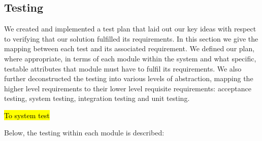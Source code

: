 \documentclass[10pt,a4paper]{article}
\begin{document}
\subsection{Testing} 
We created and implemented a test plan that laid out our key ideas
with respect to verifying that our solution fulfilled its
requirements. In this section we give the mapping between each
test and its associated requirement. We
defined our plan, where appropriate, in terms of each module within
the system and what specific, testable attributes that module must
have to fulfil its requirements. We also further deconstructed the
testing into various levels of abstraction, mapping the higher level
requirements to their lower level requisite requirements: acceptance
testing, system testing, integration testing and unit
testing.


\hl{To system test}

Below, the testing within each module is described:
\end{document}
